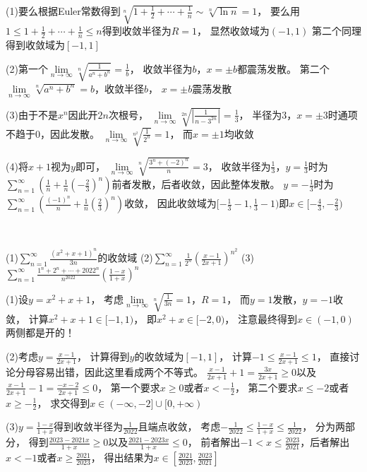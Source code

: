 \begin{solution}
  (1)要么根据Euler常数得到$\sqrt[n]{1 + \frac{1}{2} + \cdots + \frac{1}{n}} \sim \sqrt[n]{\ln n} = 1$，
  要么用$1 \leq 1 + \frac{1}{2} + \cdots + \frac{1}{n} \leq n$得到收敛半径为$R = 1$，
  显然收敛域为$(-1,1)$
  第二个同理得到收敛域为$[-1,1]$

  (2)第一个$\lim \limits _{n \rightarrow \infty} \sqrt[n]{\frac{1}{a^n + b^n}} = \frac{1}{b}$，
  收敛半径为$b$，$x = \pm b$都震荡发散。
  第二个$\lim \limits _{n \rightarrow \infty} \sqrt[n]{a^n + b^n} = b$，收敛半径$b$，
  $x = \pm b$震荡发散

  (3)由于不是$x^n$因此开$2n$次根号，
  $\lim \limits _{n \rightarrow \infty} \sqrt[2n]{|\frac{1}{n - 3^{2n}}|} = \frac{1}{3}$，
  半径为$3$，$x = \pm 3$时通项不趋于$0$，因此发散。
  $\lim \limits _{n \rightarrow \infty} \sqrt[n^2]{\frac{1}{2^n}} = 1$，
  而$x = \pm 1$均收敛

  (4)将$x+1$视为$y$即可，
  $\lim \limits _{n \rightarrow \infty} \sqrt[n]{\frac{3^n + (-2)^n}{n}} = 3$，
  收敛半径为$\frac{1}{3}$，$y = \frac{1}{3}$时为$\sum\limits_{n = 1}^{\infty}(\frac{1}{n} + \frac{1}{n}(-\frac{2}{3})^n)$前者发散，后者收敛，因此整体发散。
  $y = -\frac{1}{3}$时为$\sum\limits_{n = 1}^{\infty}(\frac{(-1)^n}{n} + \frac{1}{n}(\frac{2}{3})^n)$收敛，
  因此收敛域为$[-\frac{1}{3} - 1, \frac{1}{3} - 1)$即$x \in [- \frac{4}{3}, - \frac{2}{3})$
\end{solution}

~

\begin{exercise}[非常规格式幂级数]
  (1)$\sum\limits_{n = 1}^{\infty}\frac{(x^2 + x + 1)^n}{3n}$的收敛域
  (2)$\sum\limits_{n = 1}^{\infty}\frac{1}{2^n}\left( \frac{x - 1}{2x + 1} \right)^{n^2}$
  (3)$\sum\limits_{n = 1}^{\infty}\frac{1^n + 2^n + \cdots + 2022^n}{n^{2022}}\left( \frac{1 - x}{1 + x} \right)^n$
\end{exercise}

\begin{solution}
  (1)设$y = x^2 + x + 1$，
  考虑$\lim \limits _{n \rightarrow \infty} \sqrt[n]{\frac{1}{3n}} = 1$，$R = 1$，
  而$y = 1$发散，$y = -1$收敛，
  计算$x^2 + x + 1 \in [-1,1)$，
  即$x^2 + x \in [-2,0)$，
  注意最终得到$x \in (-1,0)$两侧都是开的！

  (2)考虑$y = \frac{x - 1}{2x + 1}$，
  计算得到$y$的收敛域为$[-1,1]$，
  计算$-1 \leq \frac{x - 1}{2x + 1} \leq 1$，
  直接讨论分母容易出错，因此这里看成两个不等式。
  $\frac{x - 1}{2x + 1} + 1 = \frac{3x}{2x + 1} \geq 0$以及$\frac{x - 1}{2x + 1} - 1 = \frac{-x - 2}{2x + 1} \leq 0$，
  第一个要求$x \geq 0$或者$x < - \frac{1}{2}$，
  第二个要求$x \leq -2$或者$x \geq - \frac{1}{2}$，
  求交得到$x \in (-\infty,-2] \cup [0,+\infty)$

  (3)$y = \frac{1-x}{1+x}$得到收敛半径为$\frac{1}{2022}$且端点收敛，
  考虑$- \frac{1}{2022} \leq \frac{1-x}{1+x} \leq \frac{1}{2022}$，
  分为两部分，
  得到$\frac{2023 - 2021x}{1 + x} \geq 0$以及$\frac{2021 - 2023x}{1 + x} \leq 0$，
  前者解出$-1 < x \leq \frac{2023}{2021}$，后者解出$x < -1$或者$x \geq \frac{2021}{2023}$，
  得出结果为$x \in [\frac{2021}{2023}, \frac{2023}{2021}]$
\end{solution}

